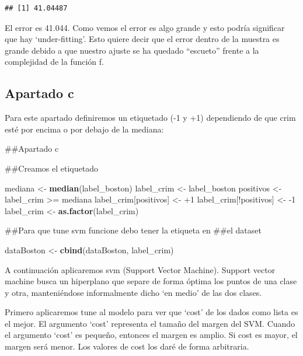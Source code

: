 \documentclass[]{article}
\newenvironment{Shaded}{\begin{snugshade}}{\end{snugshade}}
\newcommand{\KeywordTok}[1]{\textcolor[rgb]{0.13,0.29,0.53}{\textbf{{#1}}}}
\newcommand{\DecValTok}[1]{\textcolor[rgb]{0.00,0.00,0.81}{{#1}}}
\newcommand{\StringTok}[1]{\textcolor[rgb]{0.31,0.60,0.02}{{#1}}}
\newcommand{\NormalTok}[1]{{#1}}
\begin{document}
\begin{verbatim}
## [1] 41.04487
\end{verbatim}

El error es 41.044. Como vemos el error es algo grande y esto podría
significar que hay `under-fitting'. Esto quiere decir que el error
dentro de la muestra es grande debido a que nuestro ajuste se ha quedado
``escueto'' frente a la complejidad de la función f.

\subsection{Apartado c}\label{apartado-c}

Para este apartado definiremos un etiquetado (-1 y +1) dependiendo de
que crim esté por encima o por debajo de la mediana:

\begin{Shaded}
\begin{Highlighting}[]
\NormalTok{##Apartado c}

\NormalTok{##Creamos el etiquetado}

\NormalTok{mediana <-}\StringTok{ }\KeywordTok{median}\NormalTok{(label_boston)}
\NormalTok{label_crim <-}\StringTok{ }\NormalTok{label_boston}
\NormalTok{positivos <-}\StringTok{ }\NormalTok{label_crim >=}\StringTok{ }\NormalTok{mediana}
\NormalTok{label_crim[positivos] <-}\StringTok{ }\NormalTok{+}\DecValTok{1}
\NormalTok{label_crim[!positivos] <-}\StringTok{ }\NormalTok{-}\DecValTok{1}
\NormalTok{label_crim <-}\StringTok{ }\KeywordTok{as.factor}\NormalTok{(label_crim)}


\NormalTok{##Para que tune svm funcione debo tener la etiqueta en}
\NormalTok{##el dataset}

\NormalTok{dataBoston <-}\StringTok{ }\KeywordTok{cbind}\NormalTok{(dataBoston, label_crim)}
\end{Highlighting}
\end{Shaded}

A continuación aplicaremos svm (Support Vector Machine). Support vector
machine busca un hiperplano que separe de forma óptima los puntos de una
clase y otra, manteniéndose informalmente dicho `en medio' de las dos
clases.

Primero aplicaremos tune al modelo para ver que `cost' de los dados como
lista es el mejor. El argumento `cost' representa el tamaño del margen
del SVM. Cuando el argumento `cost' es pequeño, entonces el margen es
amplio. Si cost es mayor, el margen será menor. Los valores de cost los
daré de forma arbitraria.
\end{document}
